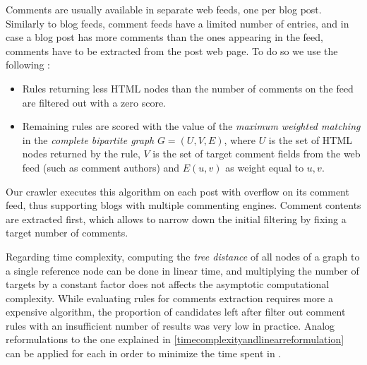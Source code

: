 Comments are usually available in separate web feeds, one per blog post. Similarly to blog feeds, comment feeds have a limited number of entries, and in case a blog post has more comments than the ones appearing in the feed, comments have to be extracted from the post web page. To do so we use the following :
\begin{itemize}
  \item Rules returning less HTML nodes than the number of comments on the feed are filtered out with a zero score.
  \item Remaining rules are scored with the value of the \emph{maximum weighted matching} in the \emph{complete bipartite graph} $G = (U, V, E)$, where $U$ is the set of HTML nodes returned by the rule, $V$ is the set of target comment fields from the web feed (such as comment authors) and $E(u, v)$ as weight equal to \code{\ref{similarityAlgo}(}$u, v$\code{)}.
\end{itemize}
Our crawler executes this algorithm on each post with overflow on its comment feed, thus supporting blogs with multiple commenting engines. Comment contents are extracted first, which allows to narrow down the initial filtering by fixing a target number of comments.

Regarding time complexity, computing the \emph{tree distance} of all nodes of a graph to a single reference node can be done in linear time, and multiplying the number of targets by a constant factor does not affects the asymptotic computational complexity. While evaluating rules for comments extraction requires more a expensive algorithm, the proportion of candidates left after filter out comment rules with an insufficient number of results was very low in practice. Analog  reformulations to the one explained in \ref{timecomplexityandlinearreformulation} can be applied for each  in order to minimize the time spent in .
